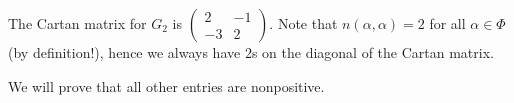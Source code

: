 The Cartan matrix for $G_2$ is $\begin{pmatrix}2 &-1\\-3&2\end{pmatrix}$.
	Note that $n(\alpha, \alpha) = 2$ for all $\alpha \in \Phi$ (by definition!), hence
	we always have $2$s on the diagonal of the Cartan matrix.

	We will prove that all other entries are nonpositive.
